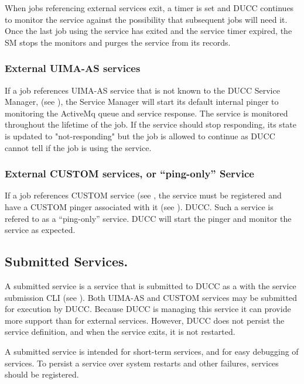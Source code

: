       When jobs referencing external services exit, a timer is set and DUCC continues to monitor the
      service against the possibility that subsequent jobs will need it. Once the last job using the
      service has exited and the service timer expired, the SM stops the monitors and purges the
      service from its records.

      \subsubsection{External UIMA-AS services}
      If a job references UIMA-AS service that is not known to the DUCC Service Manager, (see
      ), the Service Manager will start its default internal pinger to
      monitoring the ActiveMq queue and service response.  The service is monitored throughout the
      lifetime of the job. If the service should stop responding, its state is updated to
      "not-responding" but the job is allowed to continue as DUCC cannot tell if the job is using
      the service.

      \subsubsection{External CUSTOM services, or ``ping-only'' Service} 
      If a job references CUSTOM service (see , the service must be
      registered and have a CUSTOM pinger associated with it (see ).
      DUCC.  Such a service is refered to as a ``ping-only'' service.  DUCC will start the
      pinger and monitor the service as expected.
      
      
      \subsection{Submitted Services.} A submitted service is a service that is submitted to DUCC as a 
      with the service submission CLI (see ). Both UIMA-AS and CUSTOM
      services may be submitted for execution by DUCC. Because DUCC is managing this service it can
      provide more support than for external services.  However, DUCC does not persist the
      service definition, and when the service exits, it is not restarted.  

      A submitted service is intended for short-term services, and for easy debugging of services.
      To persist a service over system restarts and other failures, services should be registered.
      
